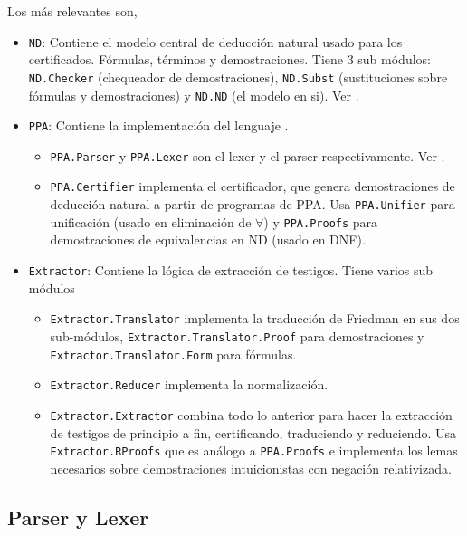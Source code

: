 Los más relevantes son,

\begin{itemize}
    \item \texttt{ND}: Contiene el modelo central de deducción natural usado para los
    certificados. Fórmulas, términos y demostraciones. Tiene 3 sub módulos:
    \texttt{ND.Checker} (chequeador de demostraciones), \texttt{ND.Subst}
    (sustituciones sobre fórmulas y demostraciones) y \texttt{ND.ND} (el modelo
    en si). Ver .
    \item \texttt{PPA}: Contiene la implementación del lenguaje \ppaLang{}.
    \begin{itemize}
        \item \texttt{PPA.Parser} y \texttt{PPA.Lexer} son el lexer y el parser
        respectivamente. Ver .
        \item \texttt{PPA.Certifier} implementa el certificador, que genera
        demostraciones de deducción natural a partir de programas de PPA. Usa
        \texttt{PPA.Unifier} para unificación (usado en eliminación de $\forall$) y \texttt{PPA.Proofs} para
        demostraciones de equivalencias en ND (usado en DNF).
    \end{itemize}
    \item \texttt{Extractor}: Contiene la lógica de extracción de testigos.
    Tiene varios sub módulos
    \begin{itemize}
        \item \texttt{Extractor.Translator} implementa la traducción de Friedman
        en sus dos sub-módulos, \texttt{Extractor.Translator.Proof} para
        demostraciones y\\\texttt{Extractor.Translator.Form} para fórmulas.
        \item \texttt{Extractor.Reducer} implementa la normalización.
        \item \texttt{Extractor.Extractor} combina todo lo anterior para hacer
        la extracción de testigos de principio a fin, certificando, traduciendo
        y reduciendo. Usa \\\texttt{Extractor.RProofs} que es análogo a
        \texttt{PPA.Proofs} e implementa los lemas necesarios sobre
        demostraciones intuicionistas con negación relativizada.
    \end{itemize}
\end{itemize}


\subsection{Parser y Lexer}
\label{ppa-tool:sec:parser-lexer}

